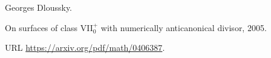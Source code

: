 Georges Dloussky.

\newblock On surfaces of class {VII}$_0^+$ with numerically anticanonical
  divisor, 2005.

\newblock URL \url{https://arxiv.org/pdf/math/0406387}.

